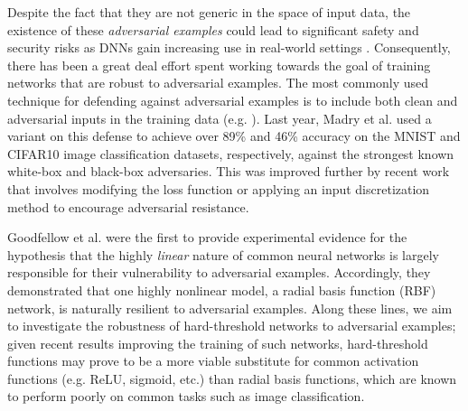 Despite the fact that they are not generic in the space of input data, the existence of these \textit{adversarial examples} could lead to significant safety and security risks as DNNs gain increasing use in real-world settings \cite{yuan2018}. Consequently, there has been a great deal effort spent working towards the goal of training networks that are robust to adversarial examples. The most commonly used technique for defending against adversarial examples is to include both clean and adversarial inputs in the training data (e.g. \cite{szegedy2014, goodfellow2014, tramer2018, madry2018}). Last year, Madry et al. used a variant on this defense to achieve over 89\% and 46\% accuracy on the MNIST and CIFAR10 image classification datasets, respectively, against the strongest known white-box and black-box adversaries. This was improved further by recent work that involves modifying the loss function \cite{kannan2018} or applying an input discretization method \cite{buckman2018} to encourage adversarial resistance. 

Goodfellow et al. \cite{goodfellow2014} were the first to provide experimental evidence for the hypothesis that the highly \textit{linear} nature of common neural networks is largely responsible for their vulnerability to adversarial examples. Accordingly, they demonstrated that one highly nonlinear model, a radial basis function (RBF) network, is naturally  resilient to adversarial examples. Along these lines, we aim to investigate the robustness of hard-threshold networks to adversarial examples; given recent results improving the training of such networks, hard-threshold functions may prove to be a more viable substitute for common activation functions (e.g. ReLU, sigmoid, etc.) than radial basis functions, which are known to perform poorly on common tasks such as image classification. 